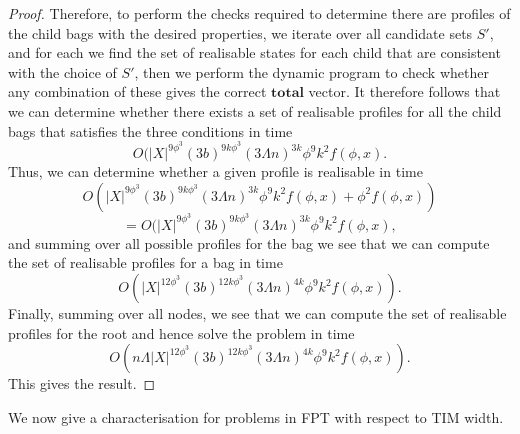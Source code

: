 \documentclass[a4paper,UKenglish,cleveref, autoref, thm-restate]{lipics-v2021} %
\begin{document}
\begin{proof}
    Therefore, to perform the checks required to determine there are profiles of the child bags with the desired properties, we iterate over all candidate sets $S'$, and for each we find the set of realisable states for each child that are consistent with the choice of $S'$, then we perform the dynamic program to check whether any combination of these gives the correct $\textbf{total}$ vector. It therefore follows that we can determine whether there exists a set of realisable profiles for all the child bags that satisfies the three conditions in time 
    \[O( |X|^{9 \phi^3} (3b)^{9k \phi^3} (3\Lambda n)^{3k}\phi^9 k^2 f(\phi,x).\]  
    Thus, we can determine whether a given profile is realisable in time 
    \[O(|X|^{9 \phi^3} (3b)^{9k \phi^3} (3\Lambda n )^{3k}\phi^9 k^2 f(\phi,x) + \phi^2 f(\phi,x)) \]
    \[= O(|X|^{9 \phi^3} (3b)^{9k \phi^3} (3\Lambda n  )^{3k}\phi^9 k^2 f(\phi,x),\] 
    and summing over all possible profiles for the bag we see that we can compute the set of realisable profiles for a bag in time
    \[ O\left(|X|^{12 \phi^3} (3b)^{12k \phi^3} (3\Lambda n )^{4k}\phi^9 k^2 f(\phi,x)\right). \]
    Finally, summing over all nodes, we see that we can compute the set of realisable profiles for the root and hence solve the problem in time
    \[
        O\left(n \Lambda |X|^{12 \phi^3} (3b)^{12k \phi^3} (3\Lambda n )^{4k}\phi^9 k^2 f(\phi,x)\right). 
    \]
  This gives the result.
\end{proof}

We now give a characterisation for problems in FPT with respect to TIM width.


\end{document}
